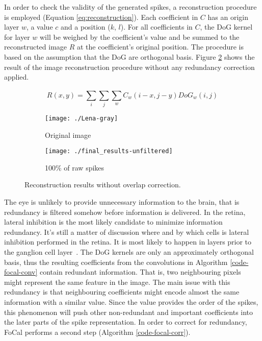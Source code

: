 In order to check the validity of the generated spikes, a reconstruction procedure is employed (Equation \ref{eq:reconstruction}). Each coefficient in $C$ has an origin layer $w$, a value $c$ and a position ($k$, $l$). For all coefficients in $C$, the DoG kernel for layer $w$ will be weighed by the coefficient's value and be summed to the reconstructed image  $R$ at the coefficient's original position. The procedure is based on the assumption that the DoG are orthogonal basis. Figure \ref{pic-unfiltered-spikes} shows the result of the image reconstruction procedure without any redundancy correction applied.

\begin{equation}
  R(x,y) = \sum_{i}^{} \sum_{j}^{} \sum_{w}^{} C_{w}(i - x, j - y)DoG_{w}(i, j)
  \label{eq:reconstruction}
\end{equation}

\begin{figure}[hbt]
  \centering
  \begin{subfigure}[t]{0.3\textwidth}
    \centering
    \captionsetup{justification=centering,margin=0.1cm}
    \texttt{[image: ./Lena-gray]}
    \caption{Original image}
  \end{subfigure}
  \begin{subfigure}[t]{0.3\textwidth}
    \centering
    \captionsetup{justification=centering,margin=0.1cm}
    \texttt{[image: ./final\_results-unfiltered]}
    \caption{100\% of raw spikes}
    \label{pic-unfiltered-spikes}
  \end{subfigure}
  \caption{Reconstruction results without overlap correction.}
\end{figure}

The eye is unlikely to provide unnecessary information to the brain, that is redundancy is filtered somehow before information is delivered. In the retina, lateral inhibition is the most likely candidate to minimize information redundancy. It's still a matter of discussion where and by which cells is lateral inhibition performed in the retina. It is most likely to happen in layers prior to the ganglion cell layer~\cite{eye-brain-vision-hubel1995}. The DoG kernels are only an approximately orthogonal basis, thus the resulting coefficients from the convolutions in Algorithm \ref{code-focal-conv} contain redundant information. That is, two neighbouring pixels might represent the same feature in the image. The main issue with this redundancy is that neighbouring coefficients might encode almost the same information with a similar value. Since the value provides the order of the spikes, this phenomenon will push other non-redundant and important coefficients into the later parts of the spike representation. In order to correct for redundancy, FoCal performs a second step (Algorithm \ref{code-focal-corr}).

